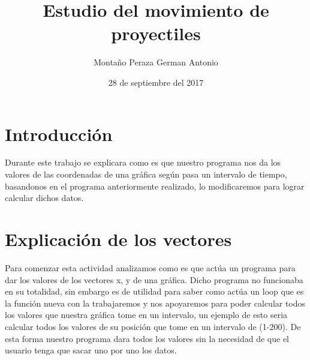 \documentclass{article}
\date{28 de septiembre del 2017}
\title{Estudio del movimiento de proyectiles}
\author{Montaño Peraza German Antonio}
\begin{document}
\maketitle
\section{Introducción}
Durante este trabajo se explicara como es que nuestro programa nos da los valores de las coordenadas de una gráfica según pasa un intervalo de tiempo, basandonos en el programa anteriormente realizado, lo modificaremos para lograr calcular dichos datos.
\section{Explicación de los vectores}
Para comenzar esta actividad analizamos como es que actúa un programa para dar los valores de los vectores x, y de una gráfica. Dicho programa no funcionaba en su totalidad, sin embargo es de utilidad para saber como actúa un loop que es la función nueva con la trabajaremos y nos apoyaremos para poder calcular todos los valores que nuestra gráfica tome en un intervalo, un ejemplo de esto seria calcular todos los valores de su posición que tome en un intervalo de (1-200). De esta forma nuestro programa dara todos los valores sin la necesidad de que el usuario tenga que sacar uno por uno los datos.
\end{document}
